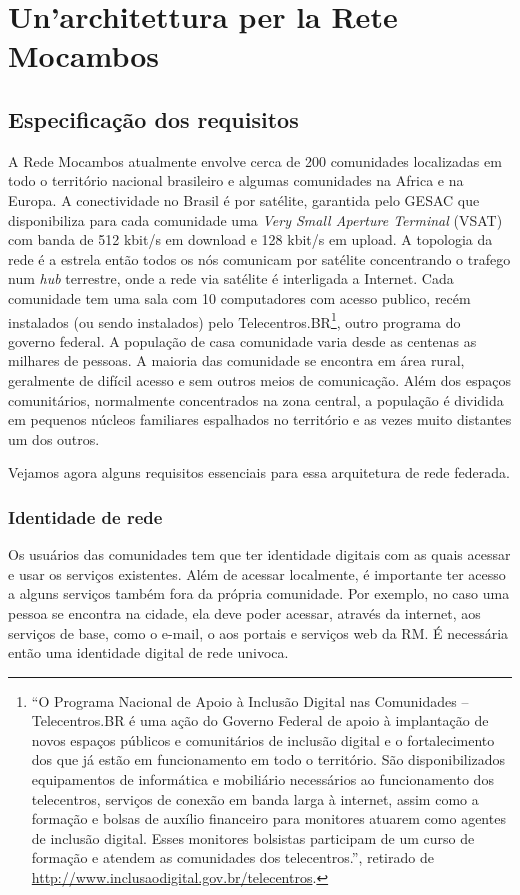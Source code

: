 
\chapter{Un'architettura per la Rete Mocambos}
\label{Capitolo3}

\section{Especificação dos requisitos}
A Rede Mocambos atualmente envolve cerca de 200 comunidades
localizadas em todo o território nacional brasileiro e algumas
comunidades na Africa e na Europa. A conectividade no Brasil é por
satélite, garantida pelo GESAC que disponibiliza para cada comunidade
uma \emph{Very Small Aperture Terminal} (VSAT) com banda de 512 kbit/s
em download e 128 kbit/s em upload. A topologia da rede é a estrela
então todos os nós comunicam por satélite concentrando o trafego num
\emph{hub} terrestre, onde a rede via satélite é interligada a
Internet. Cada comunidade tem uma sala com 10 computadores com acesso
publico, recém instalados (ou sendo instalados) pelo
Telecentros.BR\footnote{``O Programa Nacional de Apoio à Inclusão
  Digital nas Comunidades – Telecentros.BR é uma ação do Governo
  Federal de apoio à implantação de novos espaços públicos e
  comunitários de inclusão digital e o fortalecimento dos que já estão
  em funcionamento em todo o território. São disponibilizados
  equipamentos de informática e mobiliário necessários ao
  funcionamento dos telecentros, serviços de conexão em banda larga à
  internet, assim como a formação e bolsas de auxílio financeiro para
  monitores atuarem como agentes de inclusão digital. Esses monitores
  bolsistas participam de um curso de formação e atendem as
  comunidades dos telecentros.'', retirado de
  \url{http://www.inclusaodigital.gov.br/telecentros}.}, outro
programa do governo federal. A população de casa comunidade varia
desde as centenas as milhares de pessoas. A maioria das comunidade se
encontra em área rural, geralmente de difícil acesso e sem outros
meios de comunicação. Além dos espaços comunitários, normalmente
concentrados na zona central, a população é dividida em pequenos
núcleos familiares espalhados no território e as vezes muito distantes
um dos outros.

Vejamos agora alguns requisitos essenciais para essa arquitetura de
rede federada.

\subsection{Identidade de rede}
Os usuários das comunidades tem que ter identidade digitais com as
quais acessar e usar os serviços existentes. Além de acessar
localmente, é importante ter acesso a alguns serviços também fora da
própria comunidade. Por exemplo, no caso uma pessoa se encontra na
cidade, ela deve poder acessar, através da internet, aos serviços de
base, como o e-mail, o aos portais e serviços web da RM. É necessária
então uma identidade digital de rede univoca. 

